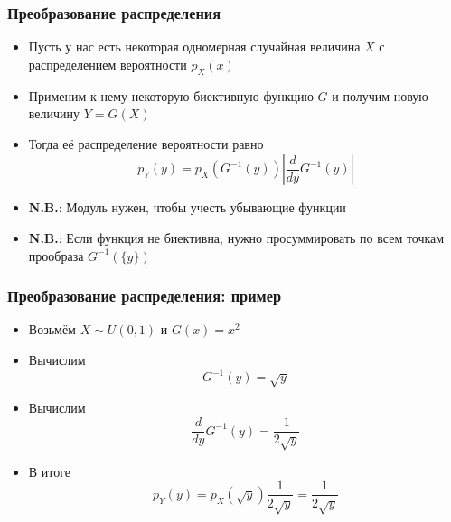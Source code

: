 \documentclass[10pt]{beamer}
\begin{document}
\begin{frame}[fragile]
\frametitle{Преобразование распределения}
\begin{itemize}
\item Пусть у нас есть некоторая одномерная случайная величина \begin{math}X\end{math} с распределением вероятности \begin{math}p_X(x)\end{math}
\pause
\item Применим к нему некоторую биективную функцию \begin{math}G\end{math} и получим новую величину \begin{math}Y = G(X)\end{math}
\pause
\item Тогда её распределение вероятности равно
\begin{equation*}
p_Y(y) = p_X(G^{-1}(y))\left|\frac{d}{dy}G^{-1}(y)\right|
\end{equation*}
\pause
\item \alert{\textbf{N.B.}}: Модуль нужен, чтобы учесть убывающие функции
\pause
\item \alert{\textbf{N.B.}}: Если функция не биективна, нужно просуммировать по всем точкам прообраза \begin{math}G^{-1}(\{y\})\end{math}
\end{itemize}
\end{frame}

\begin{frame}[fragile]
\frametitle{Преобразование распределения: пример}
\begin{itemize}
\item Возьмём \begin{math}X\sim U(0,1)\end{math} и \begin{math}G(x) = x^2\end{math}
\pause
\item Вычислим \begin{equation*}G^{-1}(y) = \sqrt y\end{equation*}
\pause
\item Вычислим \begin{equation*}\frac{d}{dy}G^{-1}(y) = \frac{1}{2\sqrt y}\end{equation*}
\pause
\item В итоге \begin{equation*}p_Y(y) = p_X(\sqrt y)\frac{1}{2\sqrt y} = \frac{1}{2\sqrt y}\end{equation*}
\end{itemize}
\end{frame}
\end{document}
